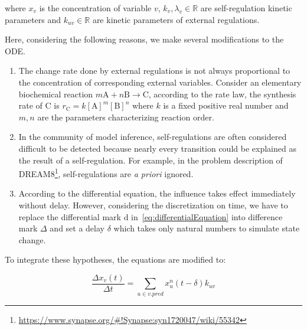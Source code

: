 where $x_v$ is the concentration of variable $v$, $k_v, \lambda_v\in \mathbb{R}$ are self-regulation kinetic parameters and $k_{uv}\in \mathbb{R}$ are kinetic parameters of external regulations.


Here, considering the following reasons, we make several modifications to the ODE.
\begin{enumerate}
    \item The change rate done by external regulations is not always proportional to the concentration of corresponding external variables. 
    Consider an elementary biochemical reaction $m\mathrm{A}+n\mathrm{B}\rightarrow \mathrm  {C}$, according to the rate law, the synthesis rate of C is $r_{\mathrm{C}}=k[{\mathrm{A}}]^{m}[{\mathrm{B}}]^{n}$ where $k$ is a fixed positive real number and $m,n$ are the parameters characterizing reaction order.
    \item In the community of model inference, self-regulations are often considered difficult to be detected because nearly every transition could be explained as the result of a self-regulation.
    For example, in the problem description of DREAM8\footnote{\url{https://www.synapse.org/\#!Synapse:syn1720047/wiki/55342}}, self-regulations are \textit{a priori} ignored.  
    \item According to the differential equation, the influence takes effect immediately without delay.
    However, considering the discretization on time, we have to replace the differential mark $\mathrm{d}$ in~\ref{eq:differentialEquation} into difference mark $\Delta$ and set a delay $\delta$ which takes only natural numbers to simulate state change.
\end{enumerate}

To integrate these hypotheses, the equations are modified to:

\begin{equation}\label{eq:differenceEquation}
    \frac{\Delta{x_v(t)}}{\Delta t}=\sum_{u\in v.pred}{x_u^{n}(t-\delta)k_{uv}}
\end{equation}


